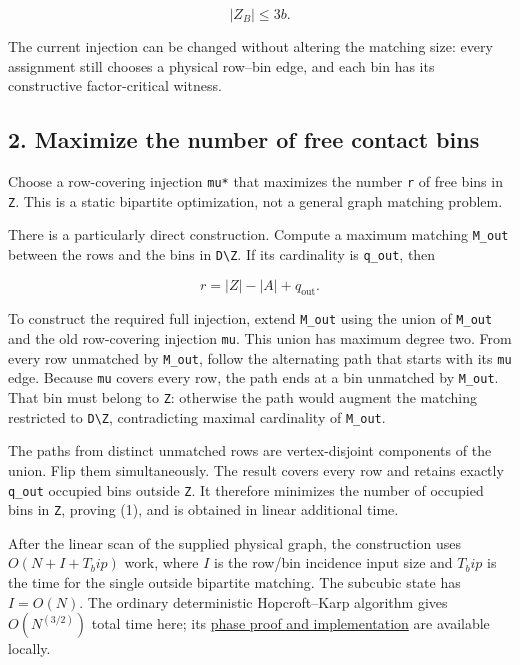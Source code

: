 \[
|Z_B|\le3b.
\]

The current injection can be changed without altering the matching size: every assignment still chooses a physical row--bin edge, and each bin has its constructive factor-critical witness.

\hypertarget{af-f687f276ee-maximize-the-number-of-free-contact-bins}{%
\subsection{2. Maximize the number of free contact bins}\label{af-f687f276ee-maximize-the-number-of-free-contact-bins}}

Choose a row-covering injection \texttt{mu*} that maximizes the number \texttt{r} of free bins in \texttt{Z}. This is a static bipartite optimization, not a general graph matching problem.

There is a particularly direct construction. Compute a maximum matching \texttt{M\_out} between the rows and the bins in \texttt{D\textbackslash{}Z}. If its cardinality is \texttt{q\_out}, then

\[
r=|Z|-|A|+q_{\mathrm{out}}.\tag{1}
\]

To construct the required full injection, extend \texttt{M\_out} using the union of \texttt{M\_out} and the old row-covering injection \texttt{mu}. This union has maximum degree two. From every row unmatched by \texttt{M\_out}, follow the alternating path that starts with its \texttt{mu} edge. Because \texttt{mu} covers every row, the path ends at a bin unmatched by \texttt{M\_out}. That bin must belong to \texttt{Z}: otherwise the path would augment the matching restricted to \texttt{D\textbackslash{}Z}, contradicting maximal cardinality of \texttt{M\_out}.

The paths from distinct unmatched rows are vertex-disjoint components of the union. Flip them simultaneously. The result covers every row and retains exactly \texttt{q\_out} occupied bins outside \texttt{Z}. It therefore minimizes the number of occupied bins in \texttt{Z}, proving (1), and is obtained in linear additional time.

After the linear scan of the supplied physical graph, the construction uses \(O(N+I+T_bip)\) work, where \(I\) is the row/bin incidence input size and \(T_bip\) is the time for the single outside bipartite matching. The subcubic state has \(I=O(N)\). The ordinary deterministic Hopcroft--Karp algorithm gives \(O(N^(3/2))\) total time here; its \href{https://github.com/icekylinx/algorithm-frontier/blob/main/problems/general-matching/reference/bipartite-proof.md}{phase proof and implementation} are available locally.

